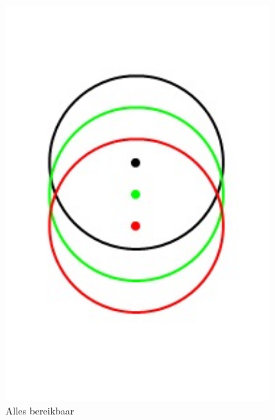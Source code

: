 \documentclass[a4paper,10pt]{article}
\begin{document}
\begin{figure}[ht!]
    \begin{minipage}{\textwidth}
        \begin{minipage}{0.3\textwidth}
            \centering
            \includegraphics[width=0.9\textwidth]{een.jpg}
            \caption*{Alles bereikbaar}
        \end{minipage}
        \hfill
        \begin{minipage}{0.3\textwidth}
            \centering

\end{minipage}
\end{minipage}
\end{figure}
\end{document}
